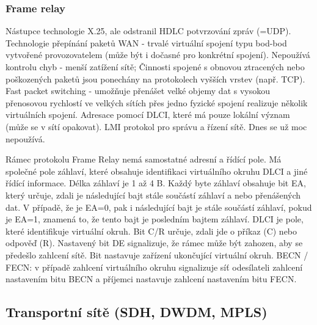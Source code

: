 \subsubsection{Frame relay}
Nástupce technologie X.25, ale odstranil HDLC potvrzování zpráv (=UDP). Technologie přepínání paketů WAN - trvalé virtuální spojení typu bod-bod vytvořené provozovatelem
(může být i dočasné pro konkrétní spojení).
Nepoužívá kontrolu chyb - menší zatížení sítě; Činnosti spojené s obnovou ztracených nebo poškozených paketů jsou ponechány na protokolech vyšších vrstev (např. TCP).
Fast packet switching - umožňuje přenášet velké objemy dat s vysokou přenosovou rychlostí ve velkých sítích přes jedno fyzické spojení realizuje několik virtuálních spojení.
Adresace pomocí DLCI, které má pouze lokální význam (může se v sítí opakovat). LMI protokol pro správu a řízení sítě. Dnes se už moc nepoužívá.

Rámec protokolu Frame Relay nemá samostatné adresní a řídící pole. Má společné pole záhlaví, které obsahuje identifikaci virtuálního okruhu DLCI a jiné řídící informace.
Délka záhlaví je 1 až 4 B. Každý byte záhlaví obsahuje bit EA, který určuje, zdali je následující bajt stále součástí záhlaví a nebo přenášených dat. V případě, že je EA=0, pak i následující bajt je stále součástí záhlaví, pokud je EA=1, znamená to, že tento bajt je posledním bajtem záhlaví. DLCI je pole, které identifikuje virtuální okruh. 
Bit C/R určuje, zdali jde o příkaz (C) nebo odpověď (R). Nastavený bit DE signalizuje, že rámec může být zahozen, aby se předešlo zahlcení sítě. Bit nastavuje zařízení ukončující virtuální okruh. BECN / FECN: v případě zahlcení virtuálního okruhu signalizuje síť odesílateli zahlcení nastavením bitu BECN a příjemci nastavuje zahlcení nastavením bitu FECN.


\subsection{Transportní sítě (SDH, DWDM, MPLS)}

